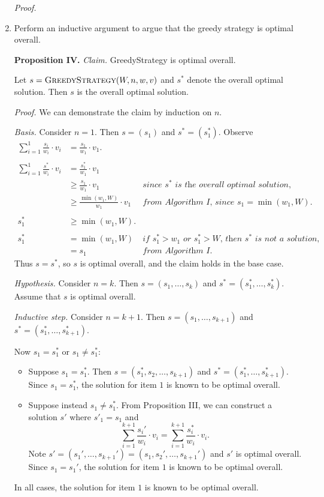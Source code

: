 \begin{enumerate}
\begin{solution}
\textit{Proof. }

\end{solution}
\item Perform an inductive argument to argue that the greedy strategy is optimal overall.
\begin{solution}
\textbf{Proposition IV. }\textit{Claim. }{\sc GreedyStrategy} is optimal overall.

Let $s=\textsc{GreedyStrategy}(W,n,w,v)$ and $s^*$ denote the overall optimal solution. Then $s$ is the overall optimal solution.

\textit{Proof. }We can demonstrate the claim by induction on $n$.

\textit{Basis. }Consider $n=1$. Then $s=(s_1)$ and $s^*=(s_1^*)$. Observe
\begin{align*}
\sum_{i=1}^1\frac{s_i}{w_i}\cdot v_i&=\frac{s_1}{w_1}\cdot v_1.\\\\
\sum_{i=1}^1\frac{s^*}{w_i}\cdot v_i
&=\frac{s_1^*}{w_1}\cdot v_1\\
&\geq\frac{s_1}{w_1}\cdot v_1&\textit{since $s^*$ is the overall optimal solution,}\\
&\geq\frac{\min(w_1,W)}{w_1}\cdot v_1&\textit{from Algorithm I, since $s_1=\min(w_1,W)$.}\\\\
s_1^*&\geq\min(w_1,W).\\\\
s_1^*&=\min(w_1,W)&\textit{if $s_1^*>w_1$ or $s_1^*>W$, then $s^*$ is not a solution,}\\
&=s_1&\textit{from Algorithm I.}
\end{align*}
Thus $s=s^*$, so $s$ is optimal overall, and the claim holds in the base case.

\textit{Hypothesis. }Consider $n=k$. Then $s=(s_1,\dots,s_k)$ and $s^*=(s_1^*,\dots,s_k^*)$. Assume that $s$ is optimal overall.

\textit{Inductive step. }Consider $n=k+1$. Then $s=(s_1,\dots,s_{k+1})$ and $s^*=(s_1^*,\dots,s_{k+1}^*)$. 

Now $s_1=s_1^*$ or $s_1\neq s_1^*$:
\begin{itemize}
    \item Suppose $s_1=s_1^*$. Then $s=(s_1^*,s_2,\dots,s_{k+1})$ and $s^*=(s_1^*,\dots,s_{k+1}^*)$. Since $s_1=s_1^*$, the solution for item $1$ is known to be optimal overall. 
     \item Suppose instead $s_1\neq s_1^*$. 
     From Proposition III, we can construct a solution $s'$ where $s'_1=s_1$ and \[\sum_{i=1}^{k+1}\frac{s_i'}{w_i}\cdot v_i=\sum_{i=1}^{k+1}\frac{s_i^*}{w_i}\cdot v_i.\] Note $s'=(s_1',\dots,s_{k+1}')=(s_1,s_2',\dots,s_{k+1}')$ and $s'$ is optimal overall. Since $s_1=s_1'$, the solution for item $1$ is known to be optimal overall.
\end{itemize}
In all cases, the solution for item $1$ is known to be optimal overall.


\end{solution}
\end{enumerate}
